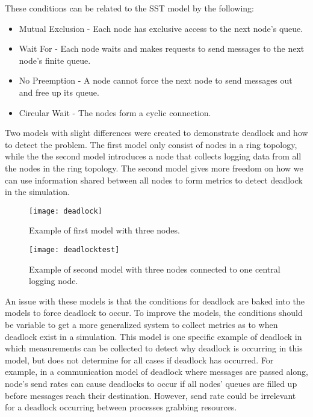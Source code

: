 \documentclass{article}
\begin{document}
These conditions can be related to the SST model by the following:

\begin{itemize}
	\item Mutual Exclusion - Each node has exclusive access to the next node's queue.
	\item Wait For - Each node waits and makes requests to send messages to the next node's finite queue.
	\item No Preemption - A node cannot force the next node to send messages out and free up its queue.
	\item Circular Wait - The nodes form a cyclic connection.
\end{itemize}

Two models with slight differences were created to demonstrate deadlock and how to detect the problem. The first model only consist of nodes in a ring topology, while the the second model introduces a node that collects logging data from all the nodes in the ring topology. The second model gives more freedom on how we can use information shared between all nodes to form metrics to detect deadlock in the simulation.

\begin{figure}[H]
	\texttt{[image: deadlock]}\newline
	\centering
	\caption{Example of first model with three nodes.}
	\centering
\end{figure}

\begin{figure}[H]
	\texttt{[image: deadlocktest]}\newline
	\centering
	\caption{Example of second model with three nodes connected to one central logging node.}
	\centering
\end{figure}

An issue with these models is that the conditions for deadlock are baked into the models to force deadlock to occur. To improve the models, the conditions should be variable to get a more generalized system to collect metrics as to when deadlock exist in a simulation. This model is one specific example of deadlock in which measurements can be collected to detect why deadlock is occurring in this model, but does not determine for all cases if deadlock has occurred. For example, in a communication model of deadlock where messages are passed along, node's send rates can cause deadlocks to occur if all nodes' queues are filled up before messages reach their destination. However, send rate could be irrelevant for a deadlock occurring between processes grabbing resources. 
\end{document}
